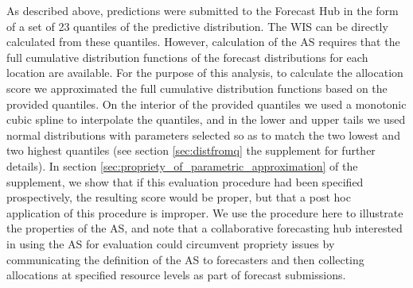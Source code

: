 \documentclass{article}\usepackage[]{graphicx}\usepackage[]{xcolor}
\begin{document}
As described above, predictions were submitted to the Forecast Hub in the form of a set of 23 quantiles of the
predictive distribution. The WIS can be directly calculated from these quantiles. However, calculation of the AS
requires that the full cumulative distribution functions of the forecast distributions for each location are available.
For the purpose of this analysis, to calculate the allocation score we approximated the full cumulative distribution
functions based on the provided quantiles. On the interior of the provided quantiles we used a monotonic cubic spline to
interpolate the quantiles, and in the lower and upper tails we used normal distributions with parameters selected so as
to match the two lowest and two highest quantiles (see section \ref{sec:distfromq} the supplement for further details).
In section \ref{sec:propriety_of_parametric_approximation} of the supplement, we show that if this evaluation procedure
had been specified prospectively, the resulting score would be proper, \textemdash but that a post hoc application of this
procedure is improper. We use the procedure here to illustrate the properties of the AS, and note that a collaborative
forecasting hub interested in using the AS for evaluation could circumvent propriety issues by communicating the
definition of the AS to forecasters and then collecting allocations at specified resource levels as part of forecast
submissions.




\end{document}
